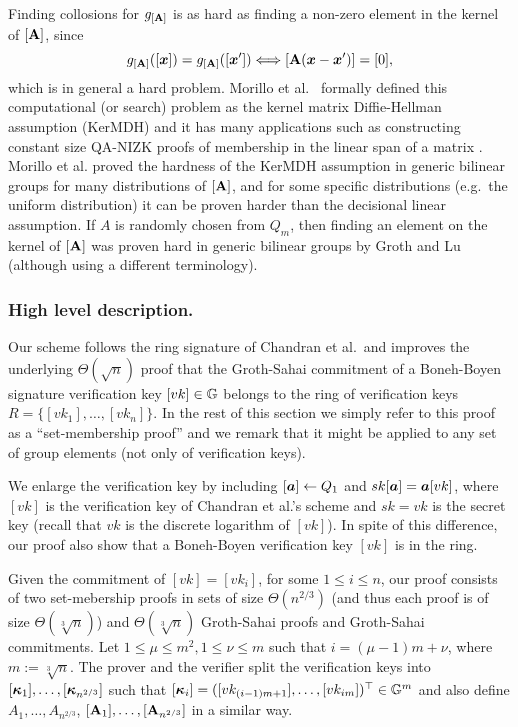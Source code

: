  Finding collosions for $g_{[\mathbf{{A}}]}$ is as hard as finding a non-zero element in the kernel of $[\mathbf{{A}}]$, since
$$
g_{[\mathbf{{A}}]}([{\boldsymbol{x}}]) = g_{[\mathbf{{A}}]}([{\boldsymbol{x}}']) \Longleftrightarrow [\mathbf{{A}}({\boldsymbol{x}}-{\boldsymbol{x}}')]=[0],
$$
which is in general a hard problem.
Morillo et al.~\cite{AC:MorRafVil16} formally defined this computational (or search) problem as the kernel matrix Diffie-Hellman assumption (KerMDH) and it has many applications such as constructing constant size QA-NIZK proofs of membership in the linear span of a matrix \cite{EC:LPJY14,EC:KilWee15}. Morillo et al. proved the hardness of the KerMDH assumption in generic bilinear groups for many distributions of $[\mathbf{{A}}]$, and for some specific distributions (e.g.~the uniform distribution) it can be proven harder than the decisional linear assumption. If $A$ is randomly chosen from $Q_m$, then finding an element on the kernel of $[\mathbf{{A}}]$ was proven hard in generic bilinear groups by Groth and Lu \cite{AC:GroLu07} (although using a different terminology).

\subsubsection{High level description.}
Our scheme follows the ring signature of Chandran et al.~and improves the underlying $\Theta(\sqrt{n})$ proof that the Groth-Sahai commitment of a Boneh-Boyen signature verification key $[vk]\in\mathbb{G}$ belongs to the ring of verification keys $R=\{[vk_1],\ldots,[vk_n]\}$. In the rest of this section we simply refer to this proof as a ``set-membership proof'' and we remark that it might be applied to any set of group elements (not only of verification keys).

We enlarge the verification key by including $[{\boldsymbol{a}}]\gets Q_1$ and $sk[{\boldsymbol{a}}]={\boldsymbol{a}}[vk]$, where $[vk]$ is the verification key of Chandran et al.'s scheme and $sk=vk$ is the secret key (recall that $vk$ is the discrete logarithm of $[vk]$). In spite of this difference, our proof also show that a Boneh-Boyen verification key $[vk]$ is in the ring. 

Given the commitment of $[vk]=[vk_i]$, for some $1\leq i\leq n$, our proof consists of two set-mebership proofs in sets of size $\Theta(n^{2/3})$ (and thus each proof is of size $\Theta(\sqrt[3]{n})$) and $\Theta(\sqrt[3]{n})$ Groth-Sahai proofs and Groth-Sahai commitments. Let $1\leq \mu\leq m^2, 1\leq \nu \leq m$  such that $i=(\mu-1)m + \nu$, where $m:=\sqrt[3]{n}$. The prover and the verifier split the verification keys into $[{\boldsymbol{\kappa}}_1],\ldots, [{\boldsymbol{\kappa}}_{n^{2/3}}]$ such that $[{\boldsymbol{\kappa}}_i] = ([vk_{(i-1)m+1}],\ldots,[vk_{im}])^\top\in\mathbb{G}^m$ and also define $A_1,\ldots, A_{n^{2/3}}$, $[\mathbf{{A}}_1],\ldots, [\mathbf{{A}}_{n^{2/3}}]$ in a similar way.

